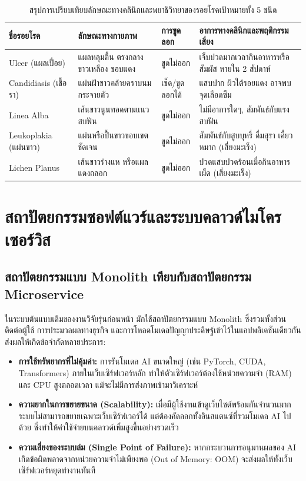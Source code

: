 \begin{table}[htbp]
\centering
\small
\caption{สรุปการเปรียบเทียบลักษณะทางคลินิกและพยาธิวิทยาของรอยโรคเป้าหมายทั้ง 5 ชนิด}
\label{tab:clinical_pathology_summary}
\begin{tabular}{p{2.8cm}p{3.2cm}p{2.6cm}p{4.2cm}}
\toprule
\textbf{ชื่อรอยโรค} & \textbf{ลักษณะทางกายภาพ} & \textbf{การขูดลอก} & \textbf{อาการทางคลินิกและพฤติกรรมเสี่ยง} \\
\midrule
Ulcer (แผลเปื่อย) & แผลหลุมตื้น ตรงกลางขาวเหลือง ขอบแดง & ขูดไม่ออก & เจ็บปวดมากเวลากินอาหารหรือสัมผัส หายใน 2 สัปดาห์ \\
Candidiasis (เชื้อรา) & แผ่นฝ้าขาวคล้ายคราบนมกระจายตัว & เช็ด/ขูดลอกได้ & แสบปาก ผิวใต้รอยแดง อาจพบจุดเลือดซึม \\
Linea Alba & เส้นขาวนูนทอดตามแนวสบฟัน & ขูดไม่ออก & ไม่มีอาการใดๆ, สัมพันธ์กับแรงสบฟัน \\
Leukoplakia (แผ่นขาว) & แผ่นหรือปื้นขาวขอบเขตชัดเจน & ขูดไม่ออก & สัมพันธ์กับสูบบุหรี่ ดื่มสุรา เคี้ยวหมาก (เสี่ยงมะเร็ง) \\
Lichen Planus & เส้นขาวร่างแห หรือแผลแดงถลอก & ขูดไม่ออก & ปวดแสบปวดร้อนเมื่อกินอาหารเผ็ด (เสี่ยงมะเร็ง) \\
\bottomrule
\end{tabular}
\end{table}

\section{สถาปัตยกรรมซอฟต์แวร์และระบบคลาวด์ไมโครเซอร์วิส}
\label{sec:software_architecture}

\subsection{สถาปัตยกรรมแบบ Monolith เทียบกับสถาปัตยกรรม Microservice}
ในระบบต้นแบบเดิมของงานวิจัยรุ่นก่อนหน้า มักใช้สถาปัตยกรรมแบบ Monolith ซึ่งรวมทั้งส่วนติดต่อผู้ใช้ การประมวลผลทางธุรกิจ และการโหลดโมเดลปัญญาประดิษฐ์เข้าไว้ในแอปพลิเคชันเดียวกัน ส่งผลให้เกิดข้อจำกัดหลายประการ:
\begin{itemize}
    \item \textbf{การใช้ทรัพยากรที่ไม่คุ้มค่า:} การรันโมเดล AI ขนาดใหญ่ (เช่น PyTorch, CUDA, Transformers) ภายในเว็บเซิร์ฟเวอร์หลัก ทำให้ตัวเซิร์ฟเวอร์ต้องใช้หน่วยความจำ (RAM) และ CPU สูงตลอดเวลา แม้จะไม่มีการส่งภาพเข้ามาวิเคราะห์
    \item \textbf{ความยากในการขยายขนาด (Scalability):} เมื่อมีผู้ใช้งานเข้าดูเว็บไซต์พร้อมกันจำนวนมาก ระบบไม่สามารถขยายเฉพาะเว็บเซิร์ฟเวอร์ได้ แต่ต้องคัดลอกทั้งอินสแตนซ์ที่รวมโมเดล AI ไปด้วย ซึ่งทำให้ค่าใช้จ่ายบนคลาวด์เพิ่มสูงขึ้นอย่างรวดเร็ว
    \item \textbf{ความเสี่ยงของระบบล่ม (Single Point of Failure):} หากกระบวนการอนุมานผลของ AI เกิดข้อผิดพลาดจากหน่วยความจำไม่เพียงพอ (Out of Memory: OOM) จะส่งผลให้ทั้งเว็บเซิร์ฟเวอร์หยุดทำงานทันที
\end{itemize}

